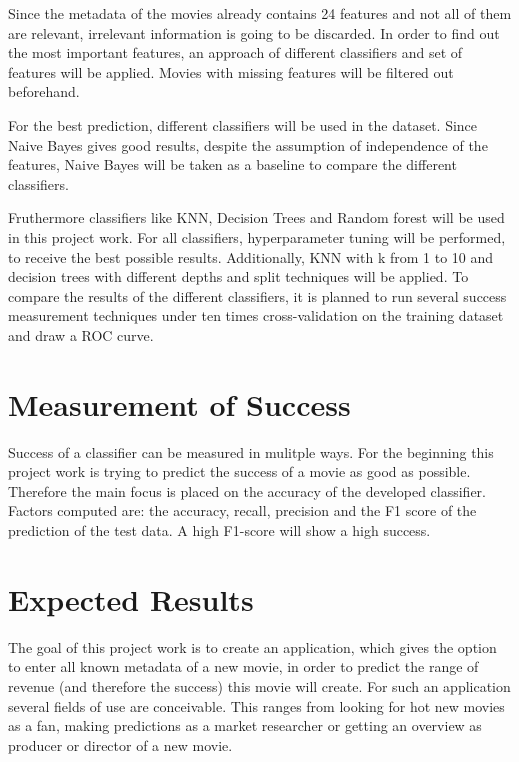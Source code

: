 Since the metadata of the movies already contains 24 features and not all of them are relevant, irrelevant information is going to be discarded. In order to find out the most important features, an approach of different classifiers and set of features will be applied. Movies with missing features will be filtered out beforehand. 

For the best prediction, different classifiers will be used in the dataset. Since Naive Bayes gives good results, despite the assumption of independence of the features, Naive Bayes will be taken as a baseline to compare the different classifiers. 

Fruthermore classifiers like KNN, Decision Trees and Random forest will be used in this project work. For all classifiers, hyperparameter tuning will be performed, to receive the best possible results. Additionally, KNN with k from 1 to 10 and decision trees with different depths and split techniques will be applied.
To compare the results of the different classifiers, it is planned to run several success measurement techniques under ten times cross-validation on the training dataset and draw a ROC curve.


\section{Measurement of Success}
Success of a classifier can be measured in mulitple ways. For the beginning this project work is trying to predict the success of a movie as good as possible. Therefore the main focus is placed on the accuracy of the developed classifier.
 Factors computed are: the accuracy, recall, precision and the F1 score of the prediction of the test data. A high F1-score will show a high success.

\section{Expected Results}
The goal of this project work is to create an application, which gives the option to enter all known metadata of a new movie, in order to predict the range of revenue (and therefore the success) this movie will create. For such an application several fields of use are conceivable. This ranges from looking for hot new movies as a fan, making predictions as a market researcher or getting an overview as producer or director of a new movie. 





